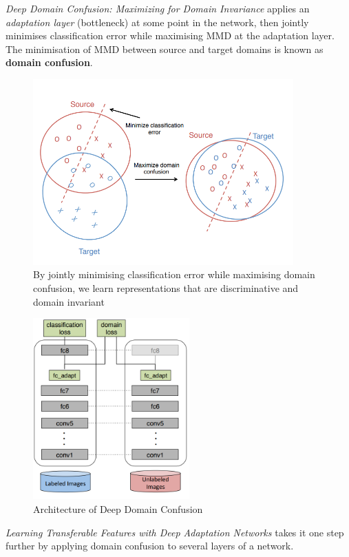 \documentclass{report}
\begin{document}
\textit{Deep Domain Confusion: Maximizing for Domain Invariance}\parencite{deepdomainconfusion} applies an \textit{adaptation layer} (bottleneck) at some point in the network, then jointly minimises classification error while maximising MMD at the adaptation layer. The minimisation of MMD between source and target domains is known as \textbf{domain confusion}.
\begin{figure}[h]
	\centering
	\includegraphics[width=10cm]{domainconfusion}
	\caption{By jointly minimising classification error while maximising domain confusion, we learn representations that are discriminative and domain invariant}
	\label{fig:domainconfusion}
\end{figure}
\begin{figure}[h]
	\centering
	\includegraphics[width=6cm]{imgs/domainconfusion2}
	\caption{Architecture of Deep Domain Confusion\parencite{deepdomainconfusion}}
	\label{fig:domainconfusion2}
\end{figure}
\textit{Learning Transferable Features with Deep Adaptation Networks}\parencite{learningtransferabledeepadaptation} takes it one step further by applying domain confusion to several layers of a network. \\
\end{document}
